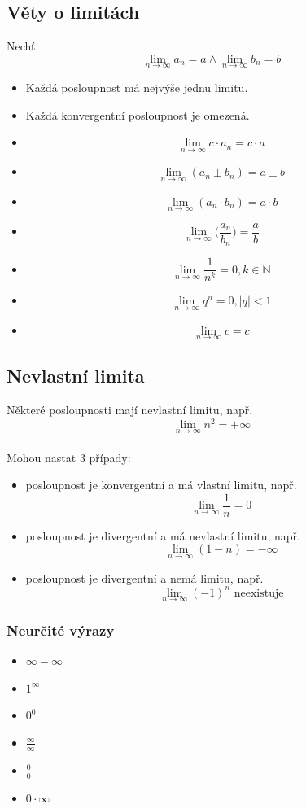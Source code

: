 \documentclass[12pt, a4paper]{article}
\begin{document}
\subsection*{Věty o limitách}
Nechť \[ \lim_{n\to\infty} a_n = a \land \lim_{n\to\infty} b_n = b \]
\begin{itemize}
	\item Každá posloupnost má nejvýše jednu limitu.
	\item Každá konvergentní posloupnost je omezená.
	\item \[ \lim_{n\to\infty} c\cdot a_n = c \cdot a \]
	\item \[ \lim_{n\to\infty} (a_n \pm b_n) =  a \pm b\]
	\item \[ \lim_{n\to\infty}  (a_n \cdot b_n) = a \cdot b\]
	\item \[ \lim_{n\to\infty} \bigg(\frac{a_n}{b_n}\bigg) = \frac{a}{b} \]
	\item \[ \lim_{n\to\infty} \frac{1}{n^k} = 0, k \in \mathbb{N}\]
	\item  \[ \lim_{n\to\infty} q^n = 0, |q|<1 \]
	\item \[ \lim_{n\to\infty} c = c \]
\end{itemize}

\subsection*{Nevlastní limita}
Některé posloupnosti mají nevlastní limitu, např. \[ \lim_{n\to\infty} n^2 = +\infty \]\\
Mohou nastat 3 případy:\\
\begin{itemize}
	\item posloupnost je konvergentní a má vlastní limitu, např. \[ \lim_{n\to\infty} \frac{1}{n}=0 \]
	\item posloupnost je divergentní a má nevlastní limitu, např. \[ \lim_{n\to\infty} (1-n)=-\infty \]
	\item posloupnost je divergentní a nemá limitu, např. \[ \lim_{n\to\infty} (-1)^n \text{ neexistuje}\]
\end{itemize}

\subsubsection*{Neurčité výrazy}
\begin{itemize}
	\item $\infty-\infty$
	\item $1^\infty$
	\item $0^0$
	\item $\frac{\infty}{\infty}$
	\item $\frac{0}{0}$
	\item $0 \cdot \infty$
\end{itemize}
\end{document}
